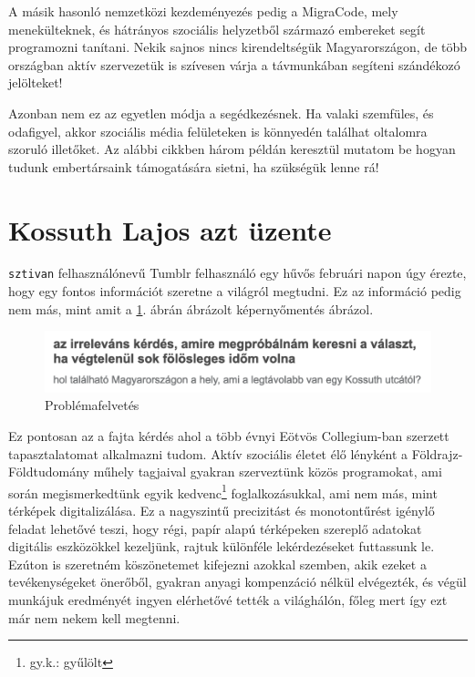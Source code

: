 \documentclass[a5paper,10pt]{article}
\begin{document}
A másik hasonló nemzetközi kezdeményezés pedig a MigraCode\cite{migracode}, mely menekülteknek, és hátrányos szociális helyzetből származó embereket segít programozni tanítani. Nekik sajnos nincs kirendeltségük Magyarországon, de több országban aktív szervezetük is szívesen várja a távmunkában segíteni szándékozó jelölteket!

\bigskip

Azonban nem ez az egyetlen módja a segédkezésnek. Ha valaki szemfüles, és odafigyel, akkor szociális média felületeken is könnyedén találhat oltalomra szoruló illetőket. Az alábbi cikkben három példán keresztül mutatom be hogyan tudunk embertársaink támogatására sietni, ha szükségük lenne rá!


\section{Kossuth Lajos azt üzente}

\texttt{sztivan} felhasználónevű Tumblr felhasználó egy hűvős februári napon úgy érezte, hogy egy fontos információt szeretne a világról megtudni. Ez az információ pedig nem más, mint amit a \ref{sztivan:question}. ábrán ábrázolt képernyőmentés ábrázol\cite{sztivan}.

\begin{figure}[!htbp]
    \centering
    \includegraphics[width=\textwidth]{images/kossuth_kerdes.png}
    \EndAccSupp{}%
    \caption{Problémafelvetés}
    \label{sztivan:question}
\end{figure}

Ez pontosan az a fajta kérdés ahol a több évnyi Eötvös Collegium-ban szerzett tapasztalatomat alkalmazni tudom. Aktív szociális életet élő lényként a Földrajz-Földtudomány műhely tagjaival gyakran szerveztünk közös programokat, ami során megismerkedtünk egyik kedvenc\footnote{gy.k.: gyűlölt} foglalkozásukkal, ami nem más, mint térképek digitalizálása. Ez a nagyszintű precizitást és monotontűrést igénylő feladat lehetővé teszi, hogy régi, papír alapú térképeken szereplő adatokat digitális eszközökkel kezeljünk, rajtuk különféle lekérdezéseket futtassunk le. Ezúton is szeretném köszönetemet kifejezni azokkal szemben, akik ezeket a tevékenységeket önerőből, gyakran anyagi kompenzáció nélkül elvégezték, és végül munkájuk eredményét ingyen elérhetővé tették a világhálón, főleg mert így ezt már nem nekem kell megtenni.
\end{document}
